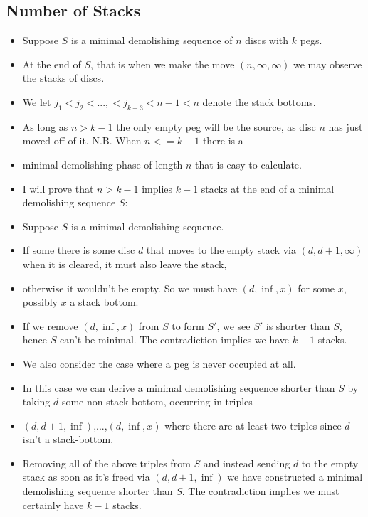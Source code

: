 \documentclass{article}
\begin{document}
\subsection{Number of Stacks}
\begin{itemize}

    \item Suppose $S$ is a minimal demolishing sequence of $n$ discs with $k$ pegs.
    \item At the end of $S$, that is when we make the move $(n,\infty,\infty)$ we may observe the stacks of discs.
    \item We let $j_1<j_2<...,<j_{k-3}<n-1<n$ denote the stack bottoms.
    \item As long as $n>k-1$ the only empty peg will be the source, as disc $n$ has just moved off of it. N.B. When $n<=k-1$ there is a  
    \item minimal demolishing phase of length $n$ that is easy to calculate.

    \item I will prove that $n>k-1$ implies $k-1$ stacks at the end of a minimal demolishing sequence $S$:
    \item Suppose $S$ is a minimal demolishing sequence.
    \item If some there is some disc $d$ that moves to the empty stack via $(d,d+1,\infty)$ when it is cleared, it must also leave the stack, \item otherwise it wouldn't be empty. So we must have $(d,\inf,x)$ for some $x$, possibly $x$ a stack bottom.
    \item If we remove $(d,\inf,x)$ from $S$ to form $S'$, we see $S'$ is shorter than $S$, hence $S$ can't be minimal. The contradiction implies we have $k-1$ stacks.
    \item We also consider the case where a peg is never occupied at all.
    \item In this case we can derive a minimal demolishing sequence shorter than $S$ by taking $d$ some non-stack bottom, occurring in triples 
    \item $(d,d+1,\inf)$,...,$(d,\inf,x)$ where there are at least two triples since $d$ isn't a stack-bottom. 
    \item Removing all of the above triples from $S$ and instead sending $d$ to the empty stack as soon as it's freed via $(d,d+1,\inf)$ we have constructed a minimal demolishing sequence shorter than $S$. The contradiction implies we must certainly have $k-1$ stacks.
\end{itemize}
\end{document}
